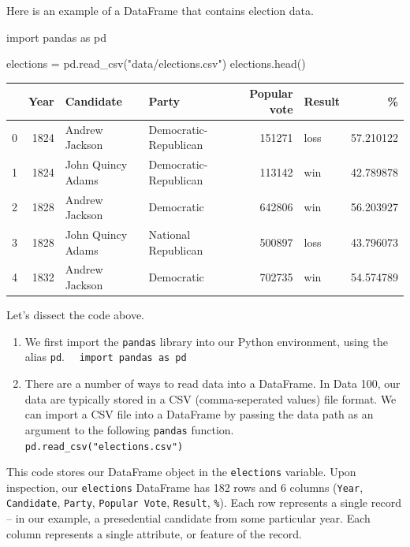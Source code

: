 \documentclass[
  letterpaper,
  DIV=11,
  numbers=noendperiod]{scrreprt}
\newenvironment{Shaded}{\begin{snugshade}}{\end{snugshade}}
\newcommand{\ImportTok}[1]{\textcolor[rgb]{0.00,0.46,0.62}{#1}}
\newcommand{\NormalTok}[1]{\textcolor[rgb]{0.00,0.23,0.31}{#1}}
\newcommand{\OperatorTok}[1]{\textcolor[rgb]{0.37,0.37,0.37}{#1}}
\newcommand{\StringTok}[1]{\textcolor[rgb]{0.13,0.47,0.30}{#1}}
\begin{document}
Here is an example of a DataFrame that contains election data.

\begin{Shaded}
\begin{Highlighting}[]
\ImportTok{import}\NormalTok{ pandas }\ImportTok{as}\NormalTok{ pd}

\NormalTok{elections }\OperatorTok{=}\NormalTok{ pd.read\_csv(}\StringTok{"data/elections.csv"}\NormalTok{)}
\NormalTok{elections.head()}
\end{Highlighting}
\end{Shaded}

\begin{tabular}{lrllrlr}
\toprule
{} &  Year &          Candidate &                  Party &  Popular vote & Result &          \% \\
\midrule
0 &  1824 &     Andrew Jackson &  Democratic-Republican &        151271 &   loss &  57.210122 \\
1 &  1824 &  John Quincy Adams &  Democratic-Republican &        113142 &    win &  42.789878 \\
2 &  1828 &     Andrew Jackson &             Democratic &        642806 &    win &  56.203927 \\
3 &  1828 &  John Quincy Adams &    National Republican &        500897 &   loss &  43.796073 \\
4 &  1832 &     Andrew Jackson &             Democratic &        702735 &    win &  54.574789 \\
\bottomrule
\end{tabular}

Let's dissect the code above.

\begin{enumerate}
\def\labelenumi{\arabic{enumi}.}
\item
  We first import the \texttt{pandas} library into our Python
  environment, using the alias \texttt{pd}.
   \texttt{import\ pandas\ as\ pd}
\item
  There are a number of ways to read data into a DataFrame. In Data 100,
  our data are typically stored in a CSV (comma-seperated values) file
  format. We can import a CSV file into a DataFrame by passing the data
  path as an argument to the following \texttt{pandas} function.
   \texttt{pd.read\_csv("elections.csv")}
\end{enumerate}

This code stores our DataFrame object in the \texttt{elections}
variable. Upon inspection, our \texttt{elections} DataFrame has 182 rows
and 6 columns (\texttt{Year}, \texttt{Candidate}, \texttt{Party},
\texttt{Popular\ Vote}, \texttt{Result}, \texttt{\%}). Each row
represents a single record -- in our example, a presedential candidate
from some particular year. Each column represents a single attribute, or
feature of the record.
\end{document}
